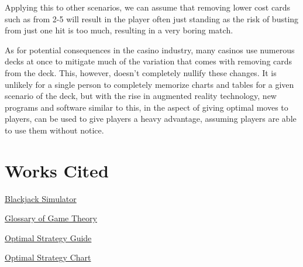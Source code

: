 \documentclass{article}
\begin{document}
        Applying this to other scenarios, we can assume that removing lower cost cards such as from 2-5 will result in the player often just standing as the risk of busting from just one hit is too much, resulting in a very boring match. 
        
        As for potential consequences in the casino industry, many casinos use numerous decks at once to mitigate much of the variation that comes with removing cards from the deck. This, however, doesn't completely nullify these changes. It is unlikely for a single person to completely memorize charts and tables for a given scenario of the deck, but with the rise in augmented reality technology, new programs and software similar to this, in the aspect of giving optimal moves to players, can be used to give players a heavy advantage, assuming players are able to use them without notice.

\section{Works Cited}
\label{sec: Works Cited}
{\parindent0pt %

	\href{https://github.com/hosua/blackjack-cs241}{Blackjack Simulator}

	\href{https://en.wikipedia.org/wiki/Glossary\_of\_game\_theory}{Glossary of Game Theory}

	\href{https://www.kjartan.co.uk/games/blackjack.htm}{Optimal Strategy Guide}

	\href{https://www.kjartan.co.uk/games/pix/cards/Blackjack%20full%20guide.pdf}{Optimal Strategy Chart}
}
\end{document}
